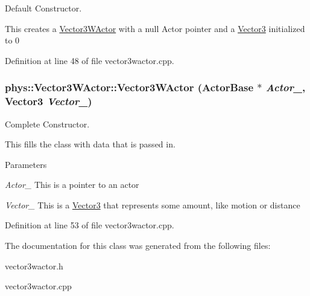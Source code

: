 Default Constructor. 

This creates a \hyperlink{classphys_1_1Vector3WActor}{Vector3WActor} with a null Actor pointer and a \hyperlink{classphys_1_1Vector3}{Vector3} initialized to 0 

Definition at line 48 of file vector3wactor.cpp.

\hypertarget{classphys_1_1Vector3WActor_ac87c4c55b9260f47f56fb01b6f061ded}{
\subsubsection[{Vector3WActor}]{\setlength{\rightskip}{0pt plus 5cm}phys::Vector3WActor::Vector3WActor ({\bf ActorBase} $\ast$ {\em Actor\_\-}, \/  {\bf Vector3} {\em Vector\_\-})}}
\label{d2/de8/classphys_1_1Vector3WActor_ac87c4c55b9260f47f56fb01b6f061ded}


Complete Constructor. 

This fills the class with data that is passed in. 
\begin{DoxyParams}{Parameters}
\item[{\em Actor\_\-}]This is a pointer to an actor \item[{\em Vector\_\-}]This is a \hyperlink{classphys_1_1Vector3}{Vector3} that represents some amount, like motion or distance \end{DoxyParams}


Definition at line 53 of file vector3wactor.cpp.



The documentation for this class was generated from the following files:\begin{DoxyCompactItemize}
\item 
vector3wactor.h\item 
vector3wactor.cpp\end{DoxyCompactItemize}
